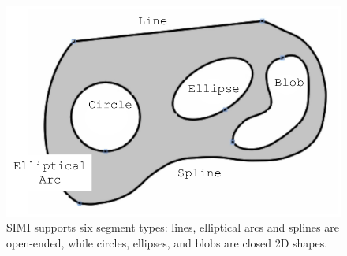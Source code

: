 \begin{figure}
  \centering
  \includegraphics[width=0.7\linewidth]{img/linework.pdf}
  \caption[Segment types]{SIMI supports six segment types: lines,
    elliptical arcs and splines are open-ended, while circles,
    ellipses, and blobs are closed 2D shapes.}
  \label{fig:linework}
\end{figure}
